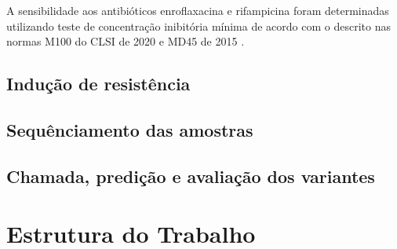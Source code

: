 A sensibilidade aos antibióticos enroflaxacina e rifampicina foram determinadas utilizando teste de concentração inibitória mínima de acordo com o descrito nas
normas M100 do CLSI de 2020 \cite{clsi2020} e MD45 de 2015 \cite{clsi2015}. 

\subsection{Indução de resistência}
\subsection{Sequênciamento das amostras}
\subsection{Chamada, predição e avaliação dos variantes}

\section{Estrutura do Trabalho}



